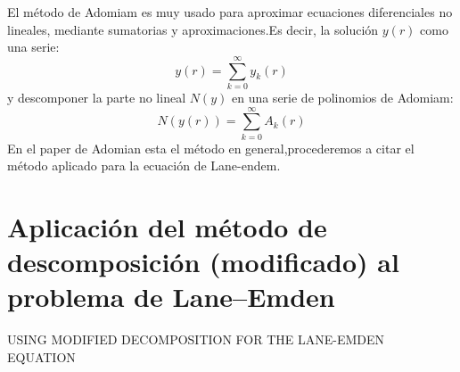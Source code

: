 \documentclass{GEM-JNL-FMP}
\theoremstyle{definition}
\numberwithin{equation}{section}
\begin{document}
El método de Adomiam es muy usado para aproximar ecuaciones diferenciales no lineales, mediante sumatorias y aproximaciones.Es decir, la solución $y(r)$ como una serie:
$$y(r)=\sum_{k=0}^{\infty}y_k(r)$$
y descomponer la parte no lineal $N(y)$ en una serie de polinomios de Adomiam:
$$N(y(r))=\sum_{k=0}^{\infty}A_k(r)$$
En el paper de Adomian \cite{adomian1995} esta el método en general,procederemos a citar el método aplicado para la ecuación de Lane-endem.

\section{Aplicación del método de descomposición (modificado) al problema de Lane--Emden}

USING MODIFIED DECOMPOSITION FOR THE LANE-EMDEN EQUATION
\end{document}
